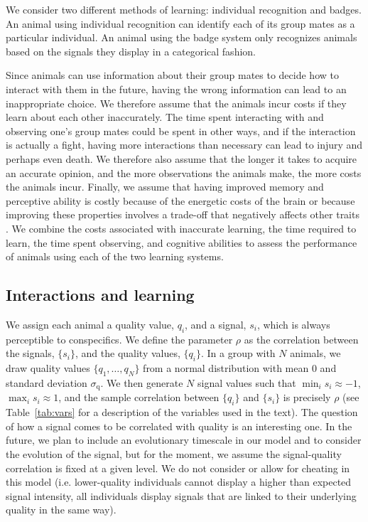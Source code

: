 We consider two different methods of learning: individual recognition and badges. An animal using individual recognition can identify each of its group mates as a particular individual. An animal using the badge system only recognizes animals based on the signals they display in a categorical fashion. 

Since animals can use information about their group mates to decide how to interact with them in the future, having the wrong information can lead to an inappropriate choice. We therefore assume that the animals incur costs if they learn about each other inaccurately. The time spent interacting with and observing one's group mates could be spent in other ways, and if the interaction is actually a fight, having more interactions than necessary can lead to injury and perhaps even death.  We therefore also assume that the longer it takes to acquire an accurate opinion, and the more observations the animals make, the more costs the animals incur. Finally, we assume that having improved memory and perceptive ability is costly because of the energetic costs of the brain \cite{Laughlin:2001qf,Laughlin:1998ly,Dunbar:1992ys} or because improving these properties involves a trade-off that negatively affects other traits \cite{MacIver:2010ve}. We combine the costs associated with inaccurate learning, the time required to learn, the time spent observing, and cognitive abilities to assess the performance of animals using each of the two learning systems. 

\subsection{Interactions and learning }
We assign each animal a quality value, $q_i$, and a signal, $s_i$, which is always perceptible to conspecifics. We define the parameter $\rho$ as the correlation between the signals, $\{s_i\}$, and the quality values, $\{q_i\}$. In a group with $N$ animals, we draw quality values $\{q_1,\dots,q_N\}$ from a normal distribution with mean $0$ and standard deviation $\sigma_\text{q}$. We then generate $N$ signal values such that $\min_i{s_i}\approx -1$, $\max_i{s_i}\approx 1$, and the sample correlation between $\{q_i\}$ and $\{s_i\}$ is precisely $\rho$ (see Table~\ref{tab:vars} for a description of the variables used in the text). The question of how a signal comes to be correlated with quality is an interesting one. In the future, we plan to include an evolutionary timescale in our model and to consider the evolution of the signal, but for the moment, we assume the signal-quality correlation is fixed at a given level.
We do not consider or allow for cheating in this model (i.e. lower-quality individuals cannot display a higher than expected signal intensity, all individuals display signals that are linked to their underlying quality in the same way).
  
